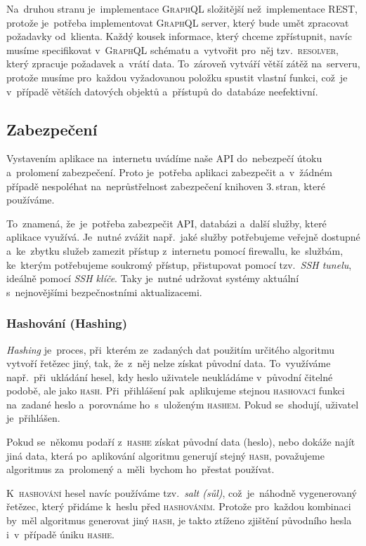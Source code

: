 \documentclass[14pt,a4paper]{article}
\begin{document}
        Na~druhou stranu je~implementace \textsc{GraphQL} složitější než~implementace \textsc{REST}, protože je~potřeba implementovat \textsc{GraphQL} server, který bude umět zpracovat požadavky od~klienta. Každý kousek informace, který chceme zpřístupnit, navíc musíme specifikovat v~\textsc{GraphQL} schématu a~vytvořit pro~něj tzv.~\textsc{resolver}, který zpracuje požadavek a~vrátí data. To~zároveň vytváří větší zátěž na~serveru, protože musíme pro~každou vyžadovanou položku spustit vlastní funkci, což~je v~případě větších datových objektů a~přístupů do~databáze neefektivní.

        \subsection{Zabezpečení}
        Vystavením aplikace na~internetu uvádíme naše \textsc{API} do~nebezpečí útoku a~prolomení zabezpečení. Proto je~potřeba aplikaci zabezpečit a~v~žádném případě nespoléhat na~neprůstřelnost zabezpečení knihoven 3.\,stran, které používáme.
        
        To~znamená, že~je~potřeba zabezpečit \textsc{API}, databázi a~další služby, které aplikace využívá. Je~nutné zvážit např.~jaké služby potřebujeme veřejně dostupné a~ke~zbytku služeb zamezit přístup z~internetu pomocí firewallu, ke~službám, ke~kterým potřebujeme soukromý přístup, přistupovat pomocí tzv.~\emph{SSH tunelu}, ideálně pomocí \emph{SSH klíče}. Taky je~nutné udržovat systémy aktuální s~nejnovějšími bezpečnostními aktualizacemi.
            
        \subsubsection{Hashování (Hashing)}
        \emph{Hashing} je~proces, při~kterém ze~zadaných dat použitím určitého algoritmu vytvoří řetězec jiný, tak, že~z~něj nelze získat původní data. To~využíváme např.~při~ukládání hesel, kdy heslo uživatele neukládáme v~původní čitelné podobě, ale jako \textsc{hash}. Při~přihlášení pak~aplikujeme stejnou \textsc{hashovací} funkci na~zadané heslo a~porovnáme ho~s~uloženým \textsc{hashem}. Pokud se~shodují, uživatel je~přihlášen.
        
        Pokud se~někomu podaří z~\textsc{hashe} získat původní data (heslo), nebo dokáže najít jiná data, která po~aplikování algoritmu generují stejný \textsc{hash}, považujeme algoritmus za~prolomený a~měli~bychom ho~přestat používat.
        
        K~\textsc{hashování} hesel navíc používáme tzv.~\emph{salt (sůl)}, což~je~náhodně vygenerovaný řetězec, který přidáme k~heslu před \textsc{hashováním}. Protože pro~každou kombinaci by~měl algoritmus generovat jiný \textsc{hash}, je takto ztíženo zjištění původního hesla i~v~případě úniku \textsc{hashe}.
        
\end{document}
